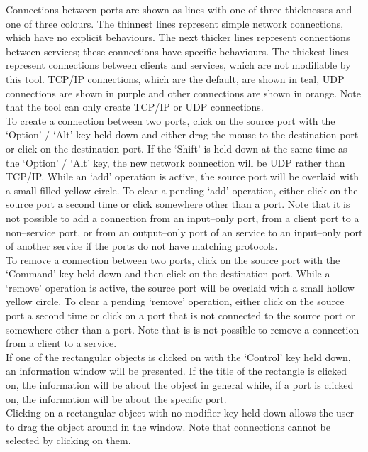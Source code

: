 Connections between ports are shown as lines with one of three thicknesses and one of
three colours.
The thinnest lines represent simple \yarp{} network connections, which have no explicit
behaviours.
The next thicker lines represent connections between  services; these
connections have specific behaviours.
The thickest lines represent connections between clients and services, which are not
modifiable by this tool.
TCP/IP connections, which are the default, are shown in teal, UDP connections are shown in
purple and other connections are shown in orange.
Note that the tool can only create TCP/IP or UDP connections.\\

To create a connection between two ports, click on the source port with the `Option' /
`Alt' key held down and either drag the mouse to the destination port or click on the
destination port.
If the `Shift' is held down at the same time as the `Option' / `Alt' key, the new
network connection will be UDP rather than TCP/IP.
While an `add' operation is active, the source port will be overlaid with a small filled
yellow circle.
To clear a pending `add' operation, either click on the source port a second time or click
somewhere other than a port.
Note that it is not possible to add a connection from an input--only port, from a client
port to a non--service port, or from an output--only port of an  service to
an input--only port of another  service if the ports do not have matching
protocols.\\

To remove a connection between two ports, click on the source port with the `Command' key
held down and then click on the destination port.
While a `remove' operation is active, the source port will be overlaid with a small
hollow yellow circle.
To clear a pending `remove' operation, either click on the source port a second time or
click on a port that is not connected to the source port or somewhere other than a port.
Note that is is not possible to remove a connection from a client to a service.\\

If one of the rectangular objects is clicked on with the `Control' key held down, an
information window will be presented.
If the title of the rectangle is clicked on, the information will be about the
object in general while, if a port is clicked on, the information will be about the
specific port.\\

Clicking on a rectangular object with no modifier key held down allows the user to drag
the object around in the window.
Note that connections cannot be selected by clicking on them.\\

